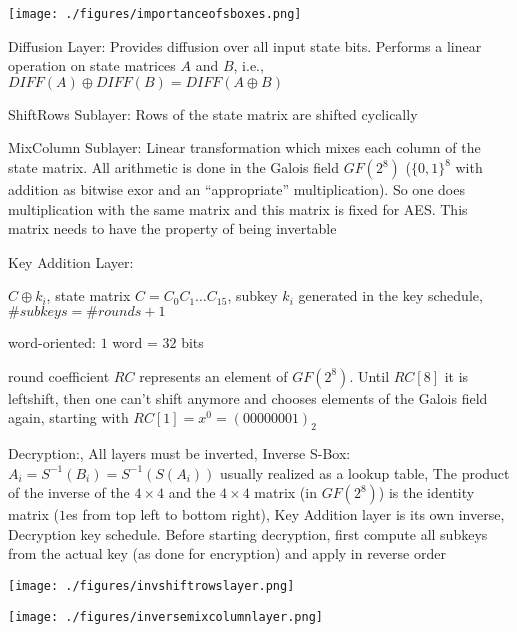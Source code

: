 \documentclass[landscape, a4paper]{article}
\begin{document}
\begin{minipage}[t]{0.2\linewidth}
\begin{betterlist}
\begin{betterlist}
\begin{betterlist}
				\texttt{[image: ./figures/importanceofsboxes.png]}
			\end{betterlist}
			\item \alert{Diffusion Layer:} Provides diffusion over all input state bits. Performs a linear operation on state matrices $A$ and $B$, i.e., $DIFF(A) \oplus DIFF(B) = DIFF(A \oplus B)$
			\begin{betterlist}
				\item \alert{ShiftRows Sublayer:} Rows of the state matrix are shifted cyclically
				\item \alert{MixColumn Sublayer:} Linear transformation which mixes each column of the state matrix. All arithmetic is done in the Galois field $GF(2^8)$ ($\{0, 1\}^8$ with addition as bitwise exor and an \enquote{appropriate} multiplication). So one does multiplication with the same matrix and this matrix is fixed for AES. This matrix needs to have the property of being \alert{invertable}
			\end{betterlist}
			\item \alert{Key Addition Layer:}
			\begin{betterlist}
				\item $C \oplus k_i$, state matrix $C = C_0C_1\ldots C_{15}$, \alert{subkey} $k_i$ generated in the \alert{key schedule}, $\#subkeys = \#rounds + 1$
				\item \alert{word-oriented:} $1$ word = $32$ bits
				\item \alert{round coefficient} $RC$ represents an element of $GF(2^8)$. Until $RC[8]$ it is leftshift, then one can't shift anymore and chooses elements of the Galois field again, starting with $RC[1] = x^0 = (00000001)_2$
			\end{betterlist}
		\end{betterlist}
		\item \alert{Decryption:}, All layers must be inverted, Inverse S-Box: $A_i = S^{-1}(B_i) = S^{-1}(S(A_i))$ usually realized as a lookup table, The product of the inverse of the $4\times 4$ and the $4\times 4$ matrix (in $GF(2^8)$) is the identity matrix ($1$es from top left to bottom right), Key Addition layer is its own inverse, Decryption key schedule. Before starting decryption, first compute all subkeys from the actual key (as done for encryption) and apply in reverse order

		\begin{minipage}[b]{0.5\linewidth}
			\texttt{[image: ./figures/invshiftrowslayer.png]}
		\end{minipage}
		\begin{minipage}[b]{0.5\linewidth}
			\texttt{[image: ./figures/inversemixcolumnlayer.png]}
		\end{minipage}
	\end{betterlist}
\end{minipage}
\end{document}
